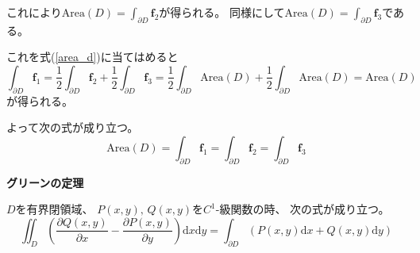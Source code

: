 \documentclass[12pt,b5paper]{ltjsarticle}
\begin{document}
\begin{enumerate}
      これにより$\mathrm{Area}(D)=\int_{\partial D}\bm{f}_2$が得られる。
      同様にして$\mathrm{Area}(D)=\int_{\partial D}\bm{f}_3$である。

      これを式(\ref{area_d})に当てはめると
      \begin{equation}
       \int_{\partial D}\bm{f}_1
        = \frac{1}{2}\int_{\partial D}\bm{f}_2
        + \frac{1}{2}\int_{\partial D}\bm{f}_3
        = \frac{1}{2}\int_{\partial D}\mathrm{Area}(D)
        + \frac{1}{2}\int_{\partial D}\mathrm{Area}(D)
        = \mathrm{Area}(D)
      \end{equation}
      が得られる。

      よって次の式が成り立つ。
      \begin{equation}
       \mathrm{Area}(D)
        = \int_{\partial D}\bm{f}_1
        = \int_{\partial D}\bm{f}_2
        = \int_{\partial D}\bm{f}_3
      \end{equation}

\end{enumerate}






\hrulefill

\textbf{グリーンの定理}

$D$を有界閉領域、
$P(x,y),\,Q(x,y)$を$C^1$-級関数の時、
次の式が成り立つ。
\begin{equation}
 \iint_D \left( \frac{\partial Q(x,y)}{\partial x}
          -\frac{\partial P(x,y)}{\partial y} \right)\mathrm{d}x\mathrm{d}y
 = \int_{\partial D}\left( P(x,y)\mathrm{d}x + Q(x,y)\mathrm{d}y \right)
 \label{Green's theorem}
\end{equation}
\end{document}
